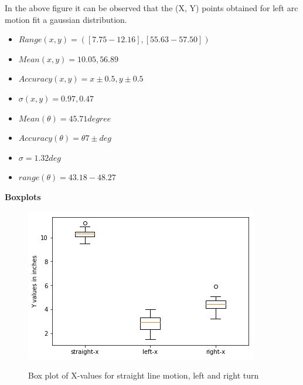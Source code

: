 \documentclass[11pt,a4paper]{article}
\begin{document}
\begin{itemize}
In the above figure it can be observed that the (X, Y) points obtained for left arc motion fit a gaussian distribution.
\begin{itemize}
\item $ Range (x,y) =([7.75-12.16],[55.63-57.50])  $
\item $ Mean (x, y) = 10.05,56.89$
\item $ Accuracy (x,y) = x \pm0.5 , y \pm0.5  $ 
\item $ \sigma (x, y)= 0.97, 0.47 $
\item $ Mean(\theta) = 45.71 degree$
\item $ Accuracy (\theta)= \theta 7\pm  deg $
\item $ \sigma = 1.32 deg$
\item $ range (\theta) = 43.18 - 48.27 $
\end{itemize}
\end{itemize}




\textbf{Boxplots}
\begin{figure}[H]
\centering
\includegraphics[width=1.0\linewidth]{boxplot-x}
\label{fig:box-x}
\caption{Box plot of X-values for straight line motion, left and right turn}
\end{figure}
\end{document}

